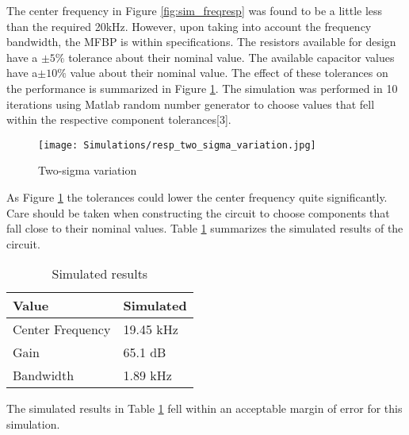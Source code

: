 The center frequency in Figure \ref{fig:sim_freqresp} was found to be a little less than the required 20kHz. However, upon taking into account the frequency bandwidth, the MFBP is within specifications. The resistors available for design have a $\pm5\%$ tolerance about their nominal value. The available capacitor values have a$\pm10\%$ value about their nominal value. The effect of these tolerances on the performance is summarized in Figure \ref{fig:twosigma}. The simulation was performed in 10 iterations using Matlab random number generator to choose values that fell within the respective component tolerances[3].

\begin{figure}[H]
    \centering
    \texttt{[image: Simulations/resp\_two\_sigma\_variation.jpg]}
    \caption{Two-sigma variation}
    \label{fig:twosigma}
\end{figure}

As Figure \ref{fig:twosigma} the tolerances could lower the center frequency quite significantly. Care should be taken when constructing the circuit to choose components that fall close to their nominal values. Table \ref{tab:simvalue} summarizes the simulated results of the circuit.

\begin{table}[H]
\centering
\caption{Simulated results}
\label{tab:simvalue}
\begin{tabular}{|l|l|}
\hline
Value            & Simulated \\ \hline
Center Frequency & 19.45 kHz \\ \hline
Gain             & 65.1 dB   \\ \hline
Bandwidth        & 1.89 kHz  \\ \hline
\end{tabular}
\end{table}

The simulated results in Table \ref{tab:simvalue} fell within an acceptable margin of error for this simulation. 
    
    


